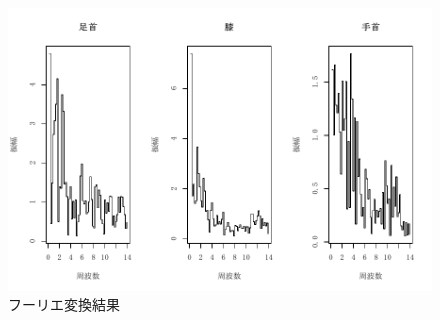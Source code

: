 \documentclass[a4j]{cis-resume}
\begin{document}
\begin{figure}[H]
  \begin{flushleft}
  \vspace{45mm}
  \includegraphics[width=0.2\linewidth]{../figs/frequency.pdf}
  \caption{フーリエ変換結果} \label{fig:変換}
\end{flushleft}
\end{figure}
\end{document}
